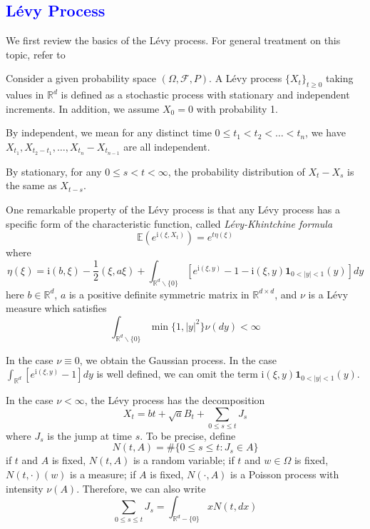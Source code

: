 \documentclass[3p,,preprint,12pt]{elsarticle}
\newcommand{\ii}[0]{\mathrm{i}}
\newcommand{\RR}[0]{\mathbb{R}}
\newcommand{\lib}[1]{\textcolor{blue}{\section{#1}}}
\theoremstyle{definition}
\begin{document}
\lib{L\'evy Process}
We first review the basics of the L\'evy process. For general treatment on this topic, refer to \cite{doney2007introduction,papapantoleon2008introduction,sato1999levy}

Consider a given probability space $(\Omega, \mathcal{F}, P)$. A L\'evy process $\{X_t\}_{t\geq 0}$ taking values in $\RR^d$ is defined as a stochastic process with stationary and independent increments. In addition, we assume $X_0=0$ with probability 1. 

By independent, we mean for any distinct time $0\leq t_1<t_2<\ldots<t_n$, we have $X_{t_1}, X_{t_2-t_1}, \ldots, X_{t_n}-X_{t_{n-1}}$ are all independent. 

By stationary,  for any $0\leq s < t <\infty$, the probability distribution of $X_t-X_s$ is the same as $X_{t-s}$.

One remarkable property of the L\'evy process is that any L\'evy process has a specific form of the characteristic function, called \textit{L\'evy-Khintchine formula}
\begin{equation}
	\mathbb{E}(e^{\ii (\xi, X_t)}) = e^{t\eta(\xi)}
\end{equation}
where
\begin{equation}\label{equ:eta}
	\eta(\xi) = \ii (b, \xi) - \frac{1}{2}(\xi, a\xi) + \int_{\RR^d\backslash \{0\}} \left[ e^{\ii (\xi, y)}-1-\ii (\xi, y)\mathbf{1}_{0<|y|<1}(y) \right]dy
\end{equation}
here $b\in \RR^d$, $a$ is a positive definite symmetric matrix in $\RR^{d\times d}$, and $\nu$ is a L\'evy measure which satisfies
\begin{equation}
	\int_{\RR^d\backslash \{0\}} \min\{1, |y|^2\}\nu(dy)<\infty
\end{equation}

In the case $\nu\equiv 0$, we obtain the Gaussian process. In the case $\int_{\RR^d} \left[ e^{\ii (\xi, y)}-1\right]dy$ is well defined, we can omit the term $\ii (\xi, y)\mathbf{1}_{0<|y|<1}(y)$. 

In the case $\nu<\infty$, the L\'evy process has the decomposition
\begin{equation}
	X_t = bt + \sqrt{a}B_t + \sum_{0\leq s\leq t} J_s 
\end{equation}
where $J_s$ is the jump at time $s$. To be precise, define 
\begin{equation}
	N(t, A) = \#\{0\leq s\leq t: J_s\in A\}
\end{equation}
if $t$ and $A$ is fixed, $N(t, A)$ is a random variable; if $t$ and $w\in \Omega$ is fixed, $N(t, \cdot)(w)$ is a measure; if $A$ is fixed, $N(\cdot, A)$ is a Poisson process with intensity $\nu(A)$. Therefore, we can also write
\begin{equation}
	\sum_{0\leq s\leq t} J_s = \int_{\RR^d-\{0\}} xN(t, dx)
\end{equation}
\end{document}
